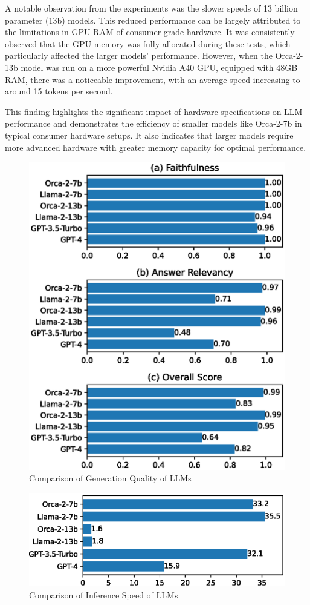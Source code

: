 \documentclass[runningheads]{llncs}
\begin{document}
A notable observation from the experiments was the slower speeds of 13 billion parameter (13b) models. This reduced performance can be largely attributed to the limitations in GPU RAM of consumer-grade hardware. It was consistently observed that the GPU memory was fully allocated during these tests, which particularly affected the larger models' performance. However, when the Orca-2-13b model was run on a more powerful Nvidia A40 GPU, equipped with 48GB RAM, there was a noticeable improvement, with an average speed increasing to around 15 tokens per second.

This finding highlights the significant impact of hardware specifications on LLM performance and demonstrates the efficiency of smaller models like Orca-2-7b in typical consumer hardware setups. It also indicates that larger models require more advanced hardware with greater memory capacity for optimal performance.

\begin{figure}
    \centering
    \includegraphics[width=0.6\linewidth]{figures/perf_scores.eps}
    \caption{Comparison of Generation Quality of LLMs}
    \label{fig:perf_scores}
\end{figure}


\begin{figure}
    \centering
    \includegraphics[width=0.6\linewidth]{figures/inference_speed.eps}
    \caption{Comparison of Inference Speed of LLMs}
    \label{fig:speed}
\end{figure}
\end{document}
